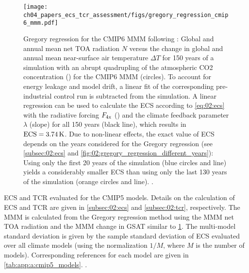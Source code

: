 \begin{figure}[t]
  \centering
  \texttt{[image: 
    ch04\_papers\_ecs\_tcr\_assessment/figs/gregory\_regression\_cmip6\_mmm.pdf]}
  \caption{Gregory regression for the \acs{CMIP}6 \acf{MMM} following
    \textcite{Gregory2004}: Global and annual mean net \acl{TOA} radiation $N$
    versus the change in global and annual mean near-surface air temperature
    $\Delta T$ for 150 years of a simulation with an abrupt quadrupling of the
    atmospheric \acs{CO2} concentration () for the \acs{CMIP}6
    \acs{MMM} (circles). To account for energy leakage and model drift, a
    linear fit of the corresponding pre-industrial control run is subtracted
    from the  simulation. A linear regression can be used to
    calculate the \acf{ECS} according to \cref{eq:02:ecs} with the radiative
    forcing $F_\mathtxt{4x}$ (\yintercept) and the climate feedback parameter
    $\lambda$ (slope) for all 150 years (black line), which results in
    $\mathtxt{ECS} = 3.74 \unit{K}$. Due to non-linear effects, the exact
    value of \acs{ECS} depends on the years considered for the Gregory
    regression (see \cref{subsec:02:ecs} and
    \cref{fig:02:gregory_regression_different_years}): Using only the first 20
    years of the simulation (blue circles and line) yields a considerably
    smaller \acs{ECS} than using only the last 130 years of the simulation
    (orange circles and line). .}
  \label{fig:04:gregory_regression_cmip6_mmm}
\end{figure}

\begin{table}[!t]
  \centering
  \caption{\Acf{ECS} and \acf{TCR} evaluated for the \acs{CMIP}5 models.
    Details on the calculation of \acs{ECS} and \acs{TCR} are given in
    \cref{subsec:02:ecs} and \cref{subsec:02:tcr}, respectively. The \acf{MMM}
    is calculated from the Gregory regression method using the \acs{MMM} net
    \acf{TOA} radiation and the \acs{MMM} change in \acf{GSAT} similar to
    \cref{fig:04:gregory_regression_cmip6_mmm}. The multi-model standard
    deviation is given by the sample standard deviation of \acs{ECS} evaluated
    over all climate models (using the normalization $1 / M$, where $M$ is the
    number of models). Corresponding references for each model are given in
    \cref{tab:app:a:cmip5_models}. .}
  \label{tab:04:ecs_tcr_cmip5}
\end{table}

